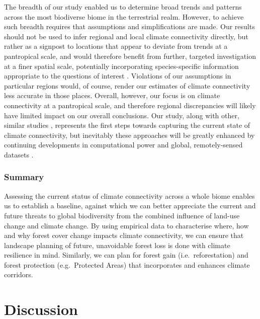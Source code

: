 \documentclass[12pt,a4paper,]{report}
\theoremstyle{definition}
\theoremstyle{definition}
\theoremstyle{definition}
\theoremstyle{remark}
\begin{document}
The breadth of our study enabled us to determine broad trends and
patterns across the most biodiverse biome in the terrestrial realm.
However, to achieve such breadth requires that assumptions and
simplifications are made. Our results should not be used to infer
regional and local climate connectivity directly, but rather as a
signpost to locations that appear to deviate from trends at a
pantropical scale, and would therefore benefit from further, targeted
investigation at a finer spatial scale, potentially incorporating
species-specific information appropriate to the questions of interest
\citep[e.g.][]{martensen_spatio-temporal_2017}. Violations of our
assumptions in particular regions would, of course, render our estimates
of climate connectivity less accurate in those places. Overall, however,
our focus is on climate connectivity at a pantropical scale, and
therefore regional discrepancies will likely have limited impact on our
overall conclusions. Our study, along with other, similar studies
\citep{mcguire_achieving_2016, martensen_spatio-temporal_2017, nunez_connectivity_2013},
represents the first steps towards capturing the current state of
climate connectivity, but inevitably these approaches will be greatly
enhanced by continuing developments in computational power and global,
remotely-sensed datasets \citep{sanchez-azofeifa_twenty-first_2017}.

\subsection{Summary}\label{summary-1}

Assessing the current status of climate connectivity across a whole
biome enables us to establish a baseline, against which we can better
appreciate the current and future threats to global biodiversity from
the combined influence of land-use change and climate change. By using
empirical data to characterise where, how and why forest cover change
impacts climate connectivity, we can ensure that landscape planning of
future, unavoidable forest loss is done with climate resilience in mind.
Similarly, we can plan for forest gain (i.e.~reforestation) and forest
protection (e.g.~Protected Areas) that incorporates and enhances climate
corridors.

\chapter{Discussion}\label{discussion-4}
\end{document}
